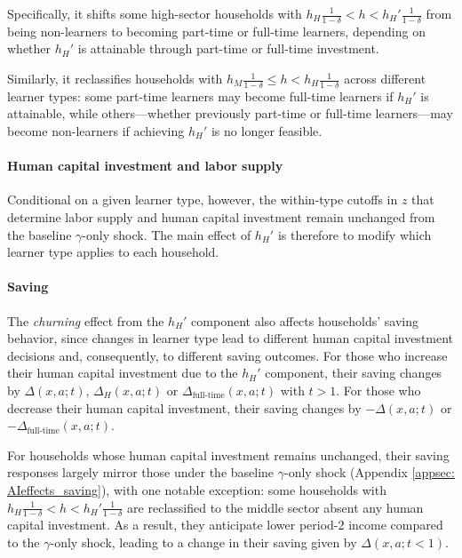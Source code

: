 \documentclass[12pt,english]{article}
\numberwithin{equation}{section}
\begin{document}
Specifically, it shifts some high-sector households with $h_H\frac{1}{1-\delta} < h < h_H'\frac{1}{1-\delta}$ from being non-learners to becoming part-time or full-time learners, depending on whether $h_H'$ is attainable through part-time or full-time investment.

Similarly, it reclassifies households with $h_M\frac{1}{1-\delta} \leq h < h_H\frac{1}{1-\delta}$ across different learner types: some part-time learners may become full-time learners if $h_H'$ is attainable, while others—whether previously part-time or full-time learners—may become non-learners if achieving $h_H'$ is no longer feasible.


\paragraph{Human capital investment and labor supply}Conditional on a given learner type, however, the within-type cutoffs in $z$ that determine labor supply and human capital investment remain unchanged from the baseline $\gamma$-only shock. The main effect of $h_H'$ is therefore to modify which learner type applies to each household.

 

\paragraph{Saving}
The \emph{churning} effect from the $h_H'$ component also affects households' saving behavior, since changes in learner type lead to different human capital investment decisions and, consequently, to different saving outcomes. For those who increase their human capital investment due to the $h_H'$ component, their saving changes by $\Delta(x,a;t)$, $\Delta_H(x,a;t)$ or $\Delta_{\text{full-time}}(x,a;t)$ with $t>1$. For those who decrease their human capital investment, their saving changes by $-\Delta(x,a;t)$ or $-\Delta_{\text{full-time}}(x,a;t)$.

For households whose human capital investment remains unchanged, their saving responses largely mirror those under the baseline $\gamma$-only shock (Appendix \ref{appsec: AIeffects_saving}), with one notable exception: some households with $h_H\frac{1}{1-\delta} < h < h_H'\frac{1}{1-\delta}$ are reclassified to the middle sector absent any human capital investment. As a result, they anticipate lower period-2 income compared to the $\gamma$-only shock, leading to a change in their saving given by $\Delta(x,a;t<1)$.
\end{document}
